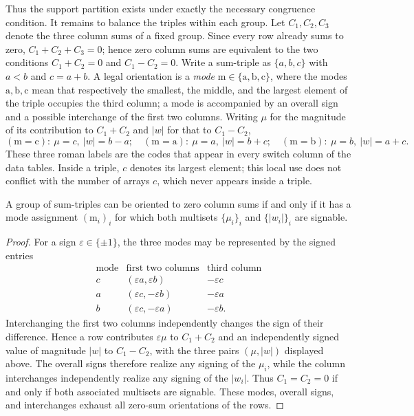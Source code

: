 Thus the support partition exists under exactly the necessary congruence condition. It remains to
balance the triples within each group. Let $C_1,C_2,C_3$ denote the three column sums of a fixed
group. Since every row already sums to zero, $C_1+C_2+C_3=0$; hence zero column sums are
equivalent to the two conditions $C_1+C_2=0$ and $C_1-C_2=0$. Write a sum-triple as
$\{a,b,c\}$ with $a<b$ and $c=a+b$. A legal orientation is a \emph{mode}
$\mathrm m\in\{\mathrm a,\mathrm b,\mathrm c\}$, where the modes $\mathrm a,\mathrm b,\mathrm c$
mean that respectively the smallest, the middle, and the largest element of the triple occupies the
third column; a mode is accompanied by an overall sign and a possible interchange of the first two
columns. Writing $\mu$ for the magnitude of its contribution to $C_1{+}C_2$ and $|w|$ for
that to $C_1{-}C_2$,
\[
(\mathrm m{=}\mathrm c):\ \mu=c,\ |w|=b-a;\quad
(\mathrm m{=}\mathrm a):\ \mu=a,\ |w|=b+c;\quad
(\mathrm m{=}\mathrm b):\ \mu=b,\ |w|=a+c.
\]
These three roman labels are the codes that appear in every switch column of the data tables.
Inside a triple, $c$ denotes its largest element; this local use does not conflict with the number
of arrays $c$, which never appears inside a triple.

\begin{lemma}\label{lem:exact}
A group of sum-triples can be oriented to zero column sums if and only if it has a mode assignment
$(\mathrm m_i)_i$ for which both multisets $\{\mu_i\}_i$ and $\{|w_i|\}_i$ are signable.
\end{lemma}
\begin{proof}
For a sign $\varepsilon\in\{\pm1\}$, the three modes may be represented by the signed entries
\[
\begin{array}{c|c|c}
\text{mode}&\text{first two columns}&\text{third column}\\\hline
c&(\varepsilon a,\varepsilon b)&-\varepsilon c\\
a&(\varepsilon c,-\varepsilon b)&-\varepsilon a\\
b&(\varepsilon c,-\varepsilon a)&-\varepsilon b.
\end{array}
\]
Interchanging the first two columns independently changes the sign of their difference. Hence a row
contributes $\varepsilon\mu$ to $C_1+C_2$ and an independently signed value of magnitude $|w|$ to
$C_1-C_2$, with the three pairs $(\mu,|w|)$ displayed above. The overall signs therefore realize
any signing of the $\mu_i$, while the column interchanges independently realize any signing of the
$|w_i|$. Thus $C_1=C_2=0$ if and only if both associated multisets are signable. These modes,
overall signs, and interchanges exhaust all zero-sum orientations of the rows.
\end{proof}

